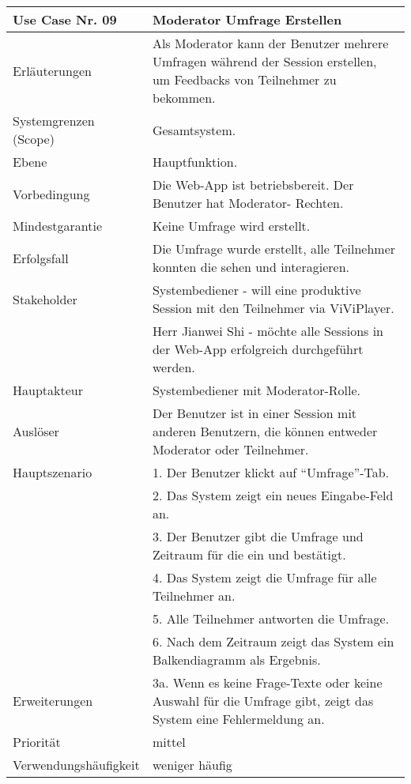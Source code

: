 \begin{tabularx}{\linewidth}{|l|X|}
	\hline
	Use Case Nr. 09			& \textbf{Moderator Umfrage Erstellen} \\ \hline
	Erläuterungen			& Als Moderator kann der Benutzer mehrere Umfragen während der 
	                          Session erstellen, um Feedbacks von Teilnehmer zu bekommen. \\ \hline
	Systemgrenzen (Scope)	& Gesamtsystem. \\ \hline
	Ebene					& Hauptfunktion. \\ \hline
	Vorbedingung			& Die Web-App ist betriebsbereit. Der Benutzer hat Moderator-
							  Rechten. \\ \hline
	Mindestgarantie			& Keine Umfrage wird erstellt. \\ \hline
	Erfolgsfall 			& Die Umfrage wurde erstellt, alle Teilnehmer konnten die sehen und 
							  interagieren. \\ \hline
	Stakeholder				& Systembediener - will eine produktive Session mit den Teilnehmer 
							  via ViViPlayer. \\
							& Herr Jianwei Shi - möchte alle Sessions in der Web-App 
							  erfolgreich durchgeführt werden. \\ \hline
	Hauptakteur				& Systembediener mit Moderator-Rolle. \\ \hline
	Auslöser				& Der Benutzer ist in einer Session mit anderen Benutzern, die 
							  können entweder Moderator oder Teilnehmer. \\ \hline	
	Hauptszenario			& 1. Der Benutzer klickt auf ``Umfrage''-Tab. \\
							& 2. Das System zeigt ein neues Eingabe-Feld an. \\ 
							& 3. Der Benutzer gibt die Umfrage und Zeitraum für die ein und 
							  bestätigt. \\
							& 4. Das System zeigt die Umfrage für alle Teilnehmer an. \\ 
							& 5. Alle Teilnehmer antworten die Umfrage. \\
							& 6. Nach dem Zeitraum zeigt das System ein Balkendiagramm als 
							  Ergebnis. \\ \hline
	Erweiterungen			& 3a. Wenn es keine Frage-Texte oder keine Auswahl für die Umfrage 
	                          gibt, zeigt das System eine Fehlermeldung an. \\ \hline
	Priorität				& mittel \\ \hline
	Verwendungshäufigkeit	& weniger häufig \\ \hline
\end{tabularx}